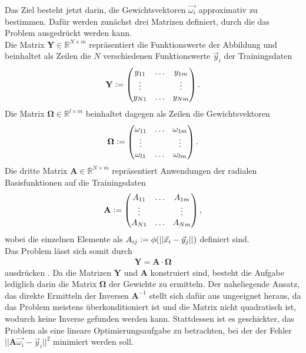 Das Ziel besteht jetzt darin, die Gewichtsvektoren $\vec{\omega_i}$ approximativ zu bestimmen. Dafür werden zunächst drei Matrizen definiert, durch die das Problem ausgedrückt werden kann.\\
Die Matrix $\mathbf{Y} \in \mathbb{R}^{N \times m}$ repräsentiert die Funktionswerte der Abbildung und beinhaltet als Zeilen die $N$ verschiedenen Funktionswerte $\vec{y}_i$ der Trainingsdaten
\begin{align}
\mathbf{Y} \vcentcolon=
\begin{pmatrix}
y_{11} & \ldots  & y_{1m} \\
\vdots & & \vdots \\
y_{N1} & \ldots  & y_{Nm} \\
\end{pmatrix}.
\end{align}
Die Matrix $\mathbf{\Omega} \in \mathbb{R}^{l \times m}$ beinhaltet dagegen als Zeilen die Gewichtsvektoren
\begin{align}
\mathbf{\Omega} \vcentcolon=
\begin{pmatrix}
\omega_{11} & \ldots  & \omega_{1m} \\
\vdots & & \vdots \\
\omega_{l1} & \ldots  & \omega_{lm} \\
\end{pmatrix}.
\end{align}
Die dritte Matrix $\mathbf{A} \in \mathbb{R}^{N \times m}$ repräsentiert Anwendungen der radialen Basisfunktionen auf die Trainingsdaten 
\begin{align}
\mathbf{A} \vcentcolon=
\begin{pmatrix}
A_{11} & \ldots  & A_{1m} \\
\vdots & & \vdots \\
A_{N1} & \ldots  & A_{Nm} \\
\end{pmatrix},
\end{align}
wobei die einzelnen Elemente als $A_{ij} \vcentcolon= \phi(|| \vec{x}_i - \vec{y}_j ||)$ definiert sind.\\
Das Problem lässt sich somit durch
\begin{align}
\mathbf{Y} = \mathbf{A} \cdot \mathbf{\Omega}
\end{align}
ausdrücken \citep{lowe2multi}. Da die Matrizen $\mathbf{Y}$ und $\mathbf{A}$ konstruiert sind, besteht die Aufgabe lediglich darin die Matrix $\mathbf{\Omega}$ der Gewichte zu ermitteln. Der naheliegende Ansatz, das direkte Ermitteln der Inversen $\mathbf{A}^{-1}$ stellt sich dafür aus ungeeignet heraus, da das Problem meistens überkonditioniert ist und die Matrix nicht quadratisch ist, wodurch keine Inverse gefunden werden kann. Stattdessen ist es geschickter, das Problem als eine lineare Optimierungsaufgabe zu betrachten, bei der der Fehler $||\mathbf{A} \vec{\omega_i} - \vec{y}_i||^2$ minimiert werden soll.\\
